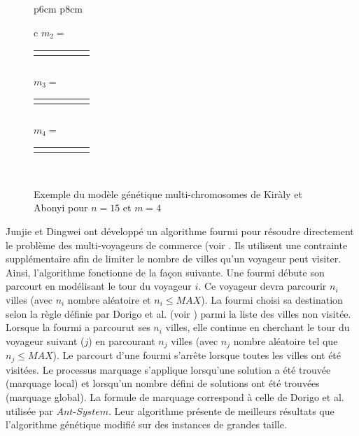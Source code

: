 \begin{figure}
\begin{tabular}{p{6cm} p{8cm}}
\begin{tabular}{c}
   $m_2=$ \begin{tabular}{|p{0.5cm}|p{0.5cm}|p{0.5cm}|p{0.5cm}p{0.5cm}}
    \cline{1-3}
     \centering 1 & \centering 11 & \centering 8 & & \tabularnewline
    \cline{1-3}
   \end{tabular}\\
   $m_3=$ \begin{tabular}{|p{0.5cm}|p{0.5cm}|p{0.5cm}|p{0.5cm}p{0.5cm}}
    \cline{1-3}
     \centering 4 & \centering 14 & \centering 6 & & \tabularnewline
    \cline{1-3}
   \end{tabular}\\
   $m_4=$ \begin{tabular}{|p{0.5cm}|p{0.5cm}|p{0.5cm}|p{0.5cm}|p{0.5cm}}
   \cline{1-4}
    \centering 12 & \centering 15 & \centering 9 & \centering 7 & \tabularnewline
   \cline{1-4}
    \end{tabular}\\
   \end{tabular}
  \end{tabular}
  \caption{Exemple du modèle génétique multi-chromosomes de Kiràly et Abonyi pour $n=15$ et $m=4$}
   \label{fig:mtsp:multichromosomes}
\end{figure}


Junjie et Dingwei ont développé un algorithme fourmi pour résoudre directement le problème des multi-voyageurs de commerce (voir \cite{Junjie2006}. Ils utilisent une contrainte supplémentaire afin de limiter le nombre de villes qu'un voyageur peut visiter. Ainsi, l'algorithme fonctionne de la façon suivante.
Une fourmi débute son parcourt en modélisant le tour du voyageur $i$.
Ce voyageur devra parcourir $n_i$ villes (avec $n_i$ nombre aléatoire et $n_i\leq MAX$). La fourmi choisi sa destination selon la règle définie par Dorigo et al. (voir \cite{Dorigo1992}) parmi la liste des villes non visitée. Lorsque la fourmi a parcourut ses $n_i$ villes, elle continue en cherchant le tour du voyageur suivant ($j$) en parcourant $n_j$ villes (avec $n_j$ nombre aléatoire tel que $n_j\leq MAX$). Le parcourt d'une fourmi s’arrête lorsque toutes les villes ont été visitées. Le processus marquage s'applique lorsqu'une solution a été trouvée (marquage local) et lorsqu'un nombre défini de solutions ont été trouvées (marquage global). La formule de marquage correspond à celle de Dorigo et al. utilisée par $Ant$-$System$.
Leur algorithme présente de meilleurs résultats que l'algorithme génétique modifié sur des instances de grandes taille.

